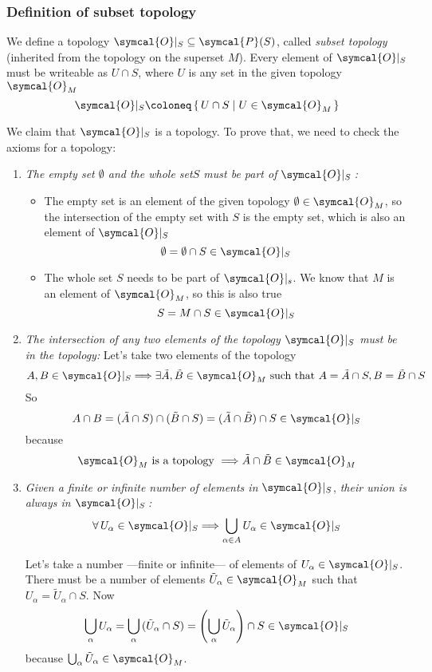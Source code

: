  \subsubsection{Definition of subset topology}
 We define a topology $\symcal{O}|_S \subseteq \symcal{P} (S)$, called
 \emph{subset topology} (inherited from the topology on the superset $M$).
 Every element of $\symcal{O}|_S$ must be writeable as $U\cap S$, where $U$ is
 any set in the given topology $\symcal{O}_M$
 \[
   \symcal{O}|_S \coloneq \set{U\cap S | U\in\symcal{O}_M}
 \]
 
 We claim that $\symcal{O}|_S$ is a topology. To prove that, we need to check
 the axioms for a topology:
 \begin{enumerate}
 \item \emph{The empty set $\emptyset$ and the whole set$S$ must be part of
     $\symcal{O}|_S$\,:}
   \begin{itemize}
   \item The empty set is an element of the given topology
     $\emptyset\in\symcal{O}_M$, so the intersection of the empty set with $S$
     is the empty set, which is also an element of $\symcal{O}|_S$
   \[
     \emptyset = \emptyset\cap S \in \symcal{O}|_S
   \]

 \item The whole set $S$ needs to be part of $\symcal{O}|_s$. We know that $M$
   is an element of $\symcal{O}_M$, so this is also true
   \[
     S = M\cap S \in \symcal{O}|_S
   \]
   \end{itemize}

 \item \emph {The intersection of any two elements of the topology}
   $\symcal{O}|_S$ \emph{must be in the topology:}
   Let's take two elements of the topology
   \[
     A, B\in\symcal{O}|_S
     \Longrightarrow
     \exists \tilde{A}, \tilde{B}\in\symcal{O}_M
     \text{ such that }
     A = \tilde{A}\cap S, B = \tilde{B}\cap S
   \]
   So
   \[
     A\cap B = (\tilde{A}\cap S) \cap (\tilde{B}\cap S)
     = (\tilde{A}\cap\tilde{B})\cap S \in\symcal{O}|_S
   \]
   because
   \[
     \symcal{O}_M \text{ is a topology }
     \Longrightarrow
     \tilde{A}\cap\tilde{B}\in \symcal{O}_M
   \]

 \item \emph{Given a finite or infinite number of elements in} $\symcal{O}|_S$,
   \emph{their union is always in $\symcal{O}|_S$\,:}
   \begin{equation}
     \forall\, U_\alpha \in \symcal{O}|_S
     \Longrightarrow
     \bigcup_{\alpha\in A} U_\alpha \in \symcal{O}|_S
   \end{equation}

   Let's take a number ---finite or infinite--- of elements of
   $U_\alpha\in\symcal{O}|_S$.
   There must be a number of elements $\tilde{U}_\alpha\in\symcal{O}_M$ such
   that $U_\alpha = \tilde{U}_\alpha \cap S$.
   Now
   \[
     \bigcup_\alpha U_\alpha
     = \bigcup_\alpha \,(\tilde{U}_\alpha\cap S)
     = \left(\bigcup_\alpha \tilde{U}_\alpha\right) \cap S\in\symcal{O}|_S
   \]
   because $\bigcup_\alpha \tilde{U}_\alpha\in\symcal{O}_M$.
 \end{enumerate}

